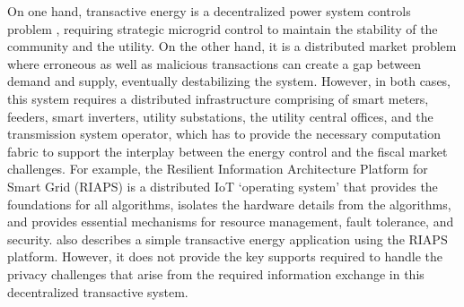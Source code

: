 On one hand, transactive energy is a decentralized power system controls problem \cite{7452738}, requiring strategic microgrid control to maintain the stability of the community and the utility. On the other hand, it is a distributed market problem where erroneous as well as malicious transactions can create a gap between demand and supply, eventually destabilizing the system.  However, in both cases, this system requires a distributed  infrastructure comprising of smart meters, feeders, smart inverters, utility substations, the utility central offices, and the transmission system operator, which has to provide the necessary computation fabric to support the interplay between the energy control and the fiscal market challenges. For example, the Resilient Information Architecture Platform for Smart Grid (RIAPS) \cite{eisele2017riaps} is a distributed IoT  `operating system' that provides the foundations for all algorithms, isolates the hardware details from the algorithms, and provides essential mechanisms for resource management, fault tolerance, and security. \cite{Scott2017ICCPS} also describes a simple transactive energy application using the RIAPS platform.
However, it does not provide the key supports required to handle the privacy challenges that arise from the required information exchange in this decentralized transactive system.


